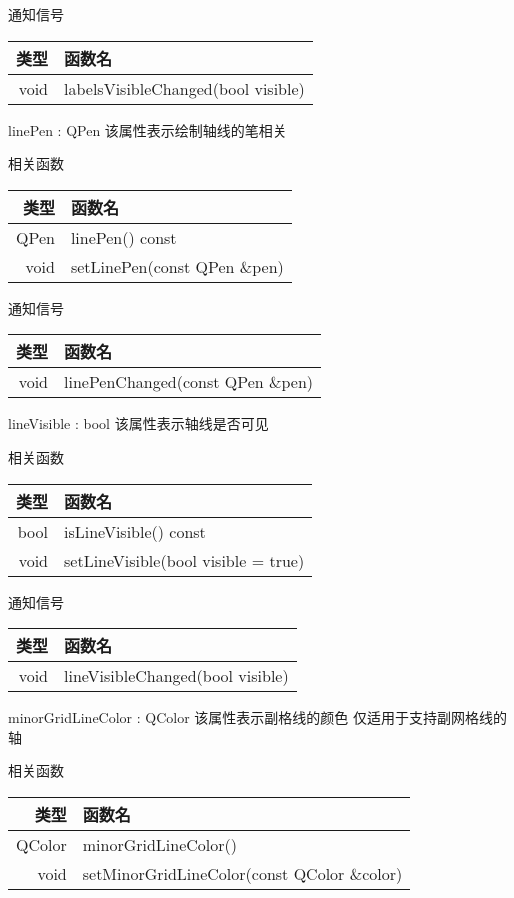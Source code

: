 通知信号

\begin{tabular}{|r|l|}
\hline
类型&函数名\\ 
\hline
void	&labelsVisibleChanged(bool visible)\\
\hline
\end{tabular}

\splitLine

linePen : QPen 该属性表示绘制轴线的笔相关

相关函数

\begin{tabular}{|r|l|}
\hline
类型&函数名\\ 
\hline
QPen	&linePen() const\\
\hline
void	& setLinePen(const QPen \&pen)\\
\hline
\end{tabular}

通知信号

\begin{tabular}{|r|l|}
\hline
类型&函数名\\ 
\hline
void &	linePenChanged(const QPen \&pen)\\
\hline
\end{tabular}

\splitLine

lineVisible : bool 该属性表示轴线是否可见

相关函数

\begin{tabular}{|r|l|}
\hline
类型&函数名\\ 
\hline
bool&	isLineVisible() const\\
\hline
void &	setLineVisible(bool visible = true)\\
\hline
\end{tabular}

通知信号

\begin{tabular}{|r|l|}
\hline
类型&函数名\\ 
\hline
void &	lineVisibleChanged(bool visible)\\
\hline
\end{tabular}

\splitLine

minorGridLineColor : QColor 该属性表示副格线的颜色 仅适用于支持副网格线的轴

相关函数

\begin{tabular}{|r|l|}
\hline
类型&函数名\\ 
\hline
QColor	&minorGridLineColor()\\
\hline
void &	setMinorGridLineColor(const QColor \&color)\\
\hline
\end{tabular}

